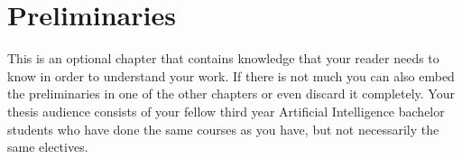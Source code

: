 \chapter{Preliminaries}\label{preliminaries}
This is an optional chapter that contains knowledge that your reader needs to know in order to understand
your work. If there is not much you can also embed the preliminaries in one of the other chapters or even discard it completely. 
Your thesis audience consists of your fellow third year Artificial Intelligence bachelor students who have done the same courses as you have, but not necessarily the same electives.
